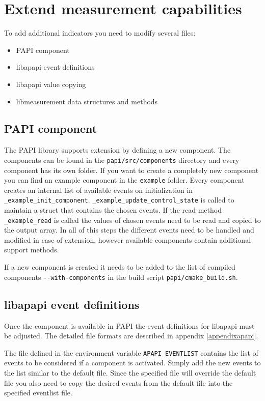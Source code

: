 \section{Extend measurement capabilities}

To add additional indicators you need to modify several files:

\begin{itemize}
\item PAPI component
\item libapapi event definitions
\item libapapi value copying
\item libmeasurement data structures and methods
\end{itemize}

\subsection{PAPI component}
The PAPI library supports extension by defining a new component.
The components can be found in the \verb+papi/src/components+ directory and every component has its own folder.
If you want to create a completely new component you can find an example component in the \verb+example+ folder.
Every component creates an internal list of available events on initialization in \verb+_example_init_component+.
\verb+_example_update_control_state+ is called to maintain a struct that contains the chosen events.
If the read method \verb+_example_read+ is called the values of chosen events need to be read and copied to the output array.
In all of this steps the different events need to be handled and modified in case of extension, however available components contain additional support methods.

If a new component is created it needs to be added to the list of compiled components \verb+--with-components+ in the build script \verb+papi/cmake_build.sh+.

\subsection{libapapi event definitions}

Once the component is available in PAPI the event definitions for libapapi must be adjusted.
The detailed file formats are described in appendix \ref{appendixapapi}.

The file defined in the environment variable \verb+APAPI_EVENTLIST+ contains the list of events to be considered if a component is activated.
Simply add the new events to the list similar to the default file.
Since the specified file will override the default file you also need to copy the desired events from the default file into the specified eventlist file.


